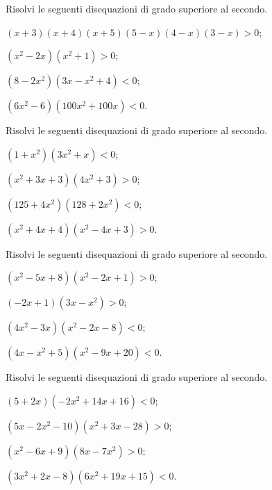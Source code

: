 \begin{esercizio}[\Ast]
 \label{ese:4.45}
Risolvi le seguenti disequazioni di grado superiore al secondo.
\begin{enumeratea}
\item $(x+3)(x+4)(x+5)(5-x)(4-x)(3-x)>0$;
\item $(x^2-2x)(x^2+1)>0$;
\item $(8-2x^2)(3x-x^2+4)<0$;
\item $(6x^2-6)(100x^2+100x)<0$.
\end{enumeratea}
\end{esercizio}

\begin{esercizio}[\Ast]
 \label{ese:4.46}
Risolvi le seguenti disequazioni di grado superiore al secondo.
\begin{multicols}{2}
\begin{enumeratea}
\item $(1+x^2)(3x^2+x)<0$;
\item $(x^2+3x+3)(4x^2+3)>0$;
\item $(125+4x^2)(128+2x^2)<0$;
\item $(x^2+4x+4)(x^2-4x+3)>0$.
\end{enumeratea}
\end{multicols}
\end{esercizio}
\newpage
\begin{esercizio}[\Ast]
 \label{ese:4.47}
Risolvi le seguenti disequazioni di grado superiore al secondo.
\begin{multicols}{2}
\begin{enumeratea}
\item $(x^2-5x+8)(x^2-2x+1)>0$;
\item $(-2x+1)(3x-x^2)>0$;
\item $(4x^2-3x)(x^2-2x-8)<0$;
\item $(4x-x^2+5)(x^2-9x+20)<0$.
\end{enumeratea}
\end{multicols}
\end{esercizio}

\begin{esercizio}[\Ast]
 \label{ese:4.48}
Risolvi le seguenti disequazioni di grado superiore al secondo.
\begin{multicols}{2}
\begin{enumeratea}
\item $(5+2x)(-2x^2+14x+16)<0$;
\item $(5x-2x^2-10)(x^2+3x-28)>0$;
\item $(x^2-6x+9)(8x-7x^2)>0$;
\item $(3x^2+2x-8)(6x^2+19x+15)<0$.
\end{enumeratea}
\end{multicols}
\end{esercizio}

